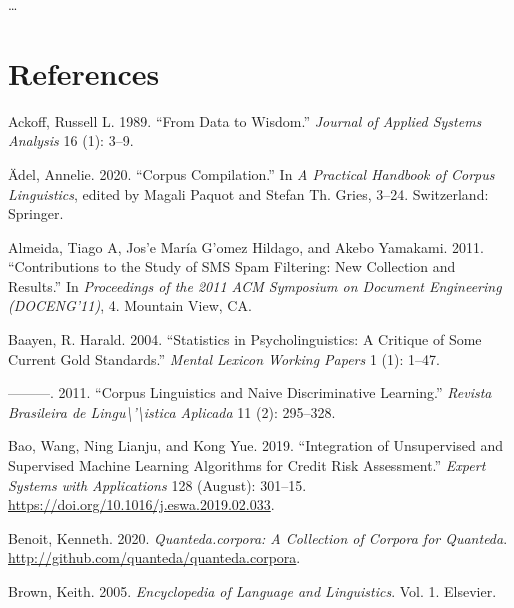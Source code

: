 \documentclass[
  letterpaper,
]{latex/krantz}
\newlength{\cslhangindent}
\newlength{\cslentryspacingunit} %
\newenvironment{CSLReferences}[2] %
 {%
  \setlength{\parindent}{0pt}
  \ifodd #1
  \let\oldpar\par
  \def\par{\hangindent=\cslhangindent\oldpar}
  \fi
  \setlength{\parskip}{#2\cslentryspacingunit}
 }%
 {}
\begin{document}
\ldots{}


\hypertarget{references}{%
\chapter*{References}\label{references}}

\hypertarget{refs}{}
\begin{CSLReferences}{1}{0}
\leavevmode{}%
Ackoff, Russell L. 1989. {``From Data to Wisdom.''} \emph{Journal of
Applied Systems Analysis} 16 (1): 3--9.

\leavevmode{}%
Ädel, Annelie. 2020. {``Corpus Compilation.''} In \emph{A Practical
Handbook of Corpus Linguistics}, edited by Magali Paquot and Stefan Th.
Gries, 3--24. Switzerland: Springer.

\leavevmode{}%
Almeida, Tiago A, Jos'e María G'omez Hildago, and Akebo Yamakami. 2011.
{``Contributions to the Study of SMS Spam Filtering: New Collection and
Results.''} In \emph{Proceedings of the 2011 ACM Symposium on Document
Engineering (DOCENG'11)}, 4. Mountain View, CA.

\leavevmode{}%
Baayen, R. Harald. 2004. {``Statistics in Psycholinguistics: A Critique
of Some Current Gold Standards.''} \emph{Mental Lexicon Working Papers}
1 (1): 1--47.

\leavevmode{}%
---------. 2011. {``Corpus Linguistics and Naive Discriminative
Learning.''} \emph{Revista Brasileira de
Lingu\textbackslash'\textbackslash istica Aplicada} 11 (2): 295--328.

\leavevmode{}%
Bao, Wang, Ning Lianju, and Kong Yue. 2019. {``Integration of
Unsupervised and Supervised Machine Learning Algorithms for Credit Risk
Assessment.''} \emph{Expert Systems with Applications} 128 (August):
301--15. \url{https://doi.org/10.1016/j.eswa.2019.02.033}.

\leavevmode{}%
Benoit, Kenneth. 2020. \emph{Quanteda.corpora: A Collection of Corpora
for Quanteda}. \url{http://github.com/quanteda/quanteda.corpora}.

\leavevmode{}%
Brown, Keith. 2005. \emph{Encyclopedia of Language and Linguistics}.
Vol. 1. Elsevier.


\end{CSLReferences}
\end{document}
